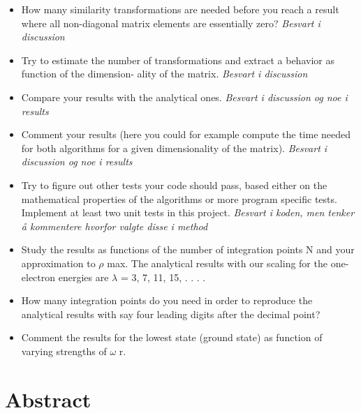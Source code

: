 \documentclass{article}
\begin{document}
\begin{itemize}

  \item How many similarity transformations are needed before you reach a result
  where all non-diagonal matrix elements are essentially zero?  \textit{Besvart i discussion}

  \item Try to estimate the number of transformations and extract a behavior as function of the dimension- ality of the matrix. \textit{Besvart i discussion}

  \item Compare your results with the analytical ones. \textit{Besvart i discussion og noe i results}

  \item Comment your results (here you could for example compute the time needed for both algorithms for a given dimensionality of the matrix). \textit{Besvart i discussion og noe i results}

  \item Try to figure out other tests your code should pass, based either on the mathematical properties of the algorithms or more program specific tests. Implement at least two unit tests in this project. \textit{Besvart i koden, men tenker å kommentere hvorfor valgte disse i method}

  \item Study the results as functions of the number of integration points N and your approximation to $\rho$ max. The analytical results with our scaling for the one-electron energies are $\lambda$ = 3, 7, 11, 15, . . . .

  \item How many integration points do you need in order to reproduce the analytical results with say four leading digits after the decimal point?

  \item Comment the results for the lowest state (ground state) as function of varying strengths of $ \omega$ r.

\end{itemize}



\vspace{1cm}

\section{Abstract} \label{sec:Abstract}
\end{document}
